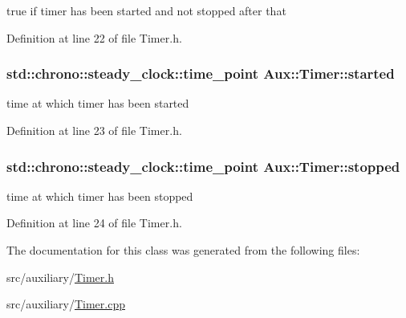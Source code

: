 true if timer has been started and not stopped after that 



Definition at line 22 of file Timer.\-h.

\hypertarget{class_aux_1_1_timer_a2fde73af550d464ac12d62eb53c3a976}{
\subsubsection[{started}]{\setlength{\rightskip}{0pt plus 5cm}std\-::chrono\-::steady\-\_\-clock\-::time\-\_\-point Aux\-::\-Timer\-::started\hspace{0.3cm}{\ttfamily [protected]}}}\label{class_aux_1_1_timer_a2fde73af550d464ac12d62eb53c3a976}


time at which timer has been started 



Definition at line 23 of file Timer.\-h.

\hypertarget{class_aux_1_1_timer_a2b2db52da1cb51c6940597173133d910}{
\subsubsection[{stopped}]{\setlength{\rightskip}{0pt plus 5cm}std\-::chrono\-::steady\-\_\-clock\-::time\-\_\-point Aux\-::\-Timer\-::stopped\hspace{0.3cm}{\ttfamily [protected]}}}\label{class_aux_1_1_timer_a2b2db52da1cb51c6940597173133d910}


time at which timer has been stopped 



Definition at line 24 of file Timer.\-h.



The documentation for this class was generated from the following files\-:\begin{DoxyCompactItemize}
\item 
src/auxiliary/\hyperlink{_timer_8h}{Timer.\-h}\item 
src/auxiliary/\hyperlink{_timer_8cpp}{Timer.\-cpp}\end{DoxyCompactItemize}
